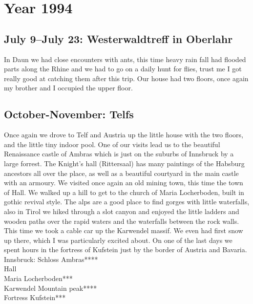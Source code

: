 \chapter{Year 1994}
\label{1994}

\section{July 9--July 23: Westerwaldtreff in Oberlahr}
\label{1994:Westerwald}

In Daun we had close encounters with ants, this time heavy rain fall had flooded parts along the Rhine and we had to go on a daily hunt for flies, trust me I got really good at catching them after this trip. Our house had two floors, once again my brother and I occupied the upper floor.\\




\section{October-November: Telfs}
\label{1994:Telfs}

Once again we drove to Telf and Austria up the little house with the two floors, and the little tiny indoor pool. One of our visits lead us to the beautiful Renaissance castle of Ambras which is just on the suburbs of Innsbruck by a large forrest. The Knight's hall (Rittersaal) has many paintings of the Habsburg ancestors all over the place, as well as a beautiful courtyard in the main castle with an armoury. We visited once again an old mining town, this time the town of Hall. We walked up a hill to get to the church of Maria Locherboden, built in gothic revival style. The alps are a good place to find gorges with little waterfalls, also in Tirol we hiked through a slot canyon and enjoyed the little ladders and wooden paths over the rapid waters and the waterfalls between the rock walls. This time we took a cable car up the Karwendel massif. We even had first snow up there, which I was particularly excited about. On one of the last days we spent hours in the fortress of Kufstein just by the border of Austria and Bavaria.\\

Innsbruck: Schloss Ambras****\\
Hall\\
Maria Locherboden***\\
Karwendel Mountain peak****\\
Fortress Kufstein***\\

